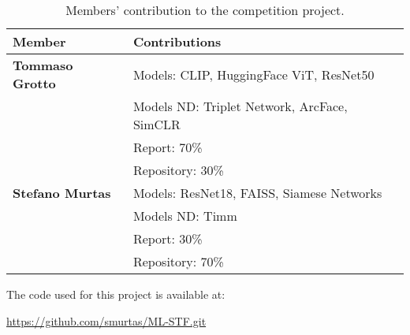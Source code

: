\documentclass[10pt,twocolumn,letterpaper]{article}
\begin{document}
\begin{table}[ht]
\centering
\caption{Members' contribution to the competition project.}
\begin{tabular}{@{}ll@{}}
\toprule
\textbf{Member} & \textbf{Contributions} \\
\midrule
\textbf{Tommaso Grotto} & Models: CLIP, HuggingFace ViT, ResNet50 \\
                        & Models ND: Triplet Network, ArcFace, SimCLR \\
                        & Report: 70\% \\
                        & Repository: 30\% \\
\addlinespace
\textbf{Stefano Murtas} & Models: ResNet18, FAISS, Siamese Networks \\
                        & Models ND: Timm \\
                        & Report: 30\% \\
                        & Repository: 70\% \\
\bottomrule
\end{tabular}
\end{table}


The code used for this project is available at:

\url{https://github.com/smurtas/ML-STF.git}
\end{document}
